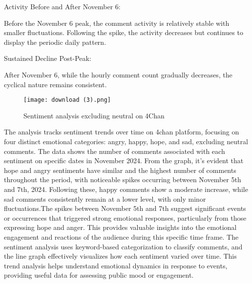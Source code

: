 \documentclass[sigconf]{acmart}
\begin{document}
Activity Before and After November 6:

Before the November 6 peak, the comment activity is relatively stable with smaller fluctuations.
Following the spike, the activity decreases but continues to display the periodic daily pattern.


Sustained Decline Post-Peak:

After November 6, while the hourly comment count gradually decreases, the cyclical nature remains consistent.



\begin{figure}[h]
    \texttt{[image: download (3).png]}
    \caption{Sentiment analysis excluding neutral on 4Chan}
    \label{fig:hourly_comments}
    
\end{figure}
The analysis tracks sentiment trends over time on 4chan platform, focusing on four distinct emotional categories: angry, happy, hope, and sad, excluding neutral comments. The data shows the number of comments associated with each sentiment on specific dates in November 2024. From the graph, it's evident that hope and angry sentiments have similar and the highest number of comments throughout the period, with noticeable spikes occurring between November 5th and 7th, 2024. Following these, happy comments show a moderate increase, while sad comments consistently remain at a lower level, with only minor fluctuations.The spikes between November 5th and 7th suggest significant events or occurrences that triggered strong emotional responses, particularly from those expressing hope and anger. This provides valuable insights into the emotional engagement and reactions of the audience during this specific time frame. The sentiment analysis uses keyword-based categorization to classify comments, and the line graph effectively visualizes how each sentiment varied over time. This trend analysis helps understand emotional dynamics in response to events, providing useful data for assessing public mood or engagement.
\end{document}
